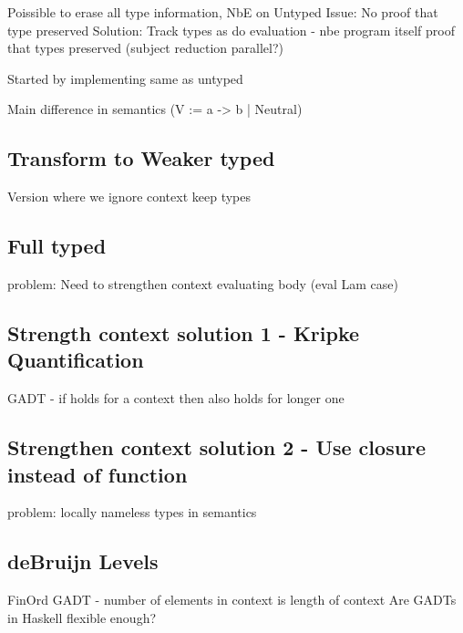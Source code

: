 \documentclass{article}
\begin{document}
Poissible to erase all type information, NbE on Untyped
Issue: No proof that type preserved 
Solution: Track types as do evaluation - nbe program itself proof that types preserved (subject reduction parallel?)

Started by implementing same as untyped

Main difference in semantics (V := a -> b | Neutral) 
\cite{slides}

\subsection{Transform to Weaker typed}
Version where we ignore context keep types

\subsection{Full typed}
problem: Need to strengthen context evaluating body (eval Lam case)
\subsection{Strength context solution 1 - Kripke Quantification}
GADT - if holds for a context then also holds for longer one
\subsection{Strengthen context solution 2 - Use closure instead of function}

problem: locally nameless types in semantics
\subsection{deBruijn Levels}
FinOrd GADT - number of elements in context is length of context
Are GADTs in Haskell flexible enough?

\cite{modalTypes}

\printbibliography
\end{document}
